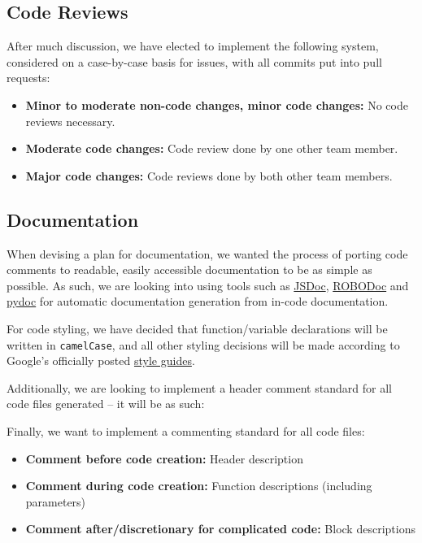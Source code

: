 \subsection{Code Reviews}

After much discussion, we have elected to implement the following system, considered on a case-by-case basis for issues, with all commits put into pull requests:

\medskip

\begin{itemize}[nosep]
    \item \textbf{Minor to moderate non-code changes, minor code changes:} No code reviews necessary.
    \item \textbf{Moderate code changes:} Code review done by one other team member.
    \item \textbf{Major code changes:} Code reviews done by both other team members.
\end{itemize}

\subsection{Documentation}

When devising a plan for documentation, we wanted the process of porting code comments to readable, easily accessible documentation to be as simple as possible. As such, we are looking into using tools such as \href{https://jsdoc.app/index.html}{JSDoc}, \href{https://rfsber.home.xs4all.nl/Robo/}{ROBODoc} and \href{https://docs.python.org/3/library/pydoc.html}{pydoc} for automatic documentation generation from in-code documentation.

For code styling, we have decided that function/variable declarations will be written in \verb|camelCase|, and all other styling decisions will be made according to Google's officially posted \href{https://google.github.io/styleguide/}{style guides}.

\medskip

Additionally, we are looking to implement a header comment standard for all code files generated -- it will be as such:



Finally, we want to implement a commenting standard for all code files:

\medskip

\begin{itemize}[nosep]
    \item \textbf{Comment before code creation:} Header description
    \item \textbf{Comment during code creation:} Function descriptions (including parameters)
    \item \textbf{Comment after/discretionary for complicated code:} Block descriptions
\end{itemize}

